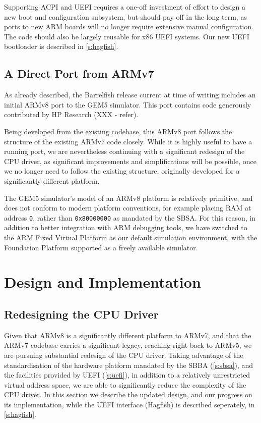 \documentclass[a4paper,twoside]{report}
\begin{document}
Supporting ACPI and UEFI requires a one-off investment of effort to design a
new boot and configuration subsystem, but should pay off in the long term, as
ports to new ARM boards will no longer require extensive manual configuration.
The code should also be largely reusable for x86 UEFI systems. Our new UEFI
bootloader is described in \autoref{s:hagfish}.

\section{A Direct Port from ARMv7}

As already described, the Barrelfish release current at time of writing
includes an initial ARMv8 port to the GEM5 simulator. This port contains code
generously contributed by HP Research (XXX - refer).

Being developed from the existing codebase, this ARMv8 port follows the
structure of the existing ARMv7 code closely. While it is highly useful to
have a running port, we are nevertheless continuing with a significant
redesign of the CPU driver, as significant improvements and simplifications
will be possible, once we no longer need to follow the existing structure,
originally developed for a significantly different platform.

The GEM5 simulator's model of an ARMv8 platform is relatively primitive, and
does not conform to modern platform conventions, for example placing RAM at
address \texttt{0}, rather than \texttt{0x80000000} as mandated by the SBSA.
For this reason, in addition to better integration with ARM debugging tools,
we have switched to the ARM Fixed Virtual Platform as our default simulation
environment, with the Foundation Platform supported as a freely available
simulator.

\chapter{Design and Implementation}\label{c:design}

\section{Redesigning the CPU Driver}

Given that ARMv8 is a significantly different platform to ARMv7, and that the
ARMv7 codebase carries a significant legacy, reaching right back to ARMv5, we
are pursuing substantial redesign of the CPU driver. Taking advantage of the
standardisation of the hardware platform mandated by the SBBA
(\autoref{s:sbsa}), and the facilities provided by UEFI (\autoref{s:uefi}), in
addition to a relatively unrestricted virtual address space, we are able to
significantly reduce the complexity of the CPU driver.  In this section we
describe the updated design, and our progress on its implementation, while the
UEFI interface (Hagfish) is described seperately, in \autoref{s:hagfish}.
\end{document}
